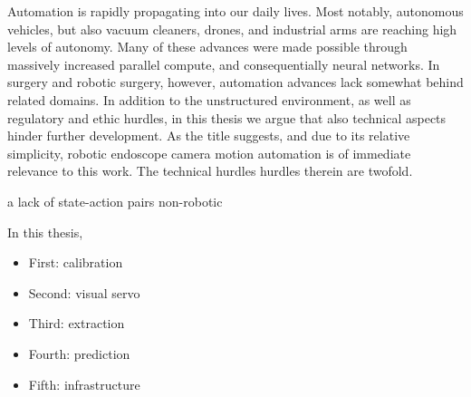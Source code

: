 Automation is rapidly propagating into our daily lives. Most notably, autonomous vehicles, but also vacuum cleaners, drones, and industrial arms are reaching high levels of autonomy. Many of these advances were made possible through massively increased parallel compute, and consequentially neural networks. In surgery and robotic surgery, however, automation advances lack somewhat behind related domains. In addition to the unstructured environment, as well as regulatory and ethic hurdles, in this thesis we argue that also technical aspects hinder further development. As the title suggests, and due to its relative simplicity, robotic endoscope camera motion automation is of immediate relevance to this work. The technical hurdles hurdles therein are twofold. 

a lack of state-action pairs 
non-robotic 

In this thesis, 

\begin{itemize}
    \item First: calibration
    \item Second: visual servo
    \item Third: extraction
    \item Fourth: prediction
    \item Fifth: infrastructure
\end{itemize}

